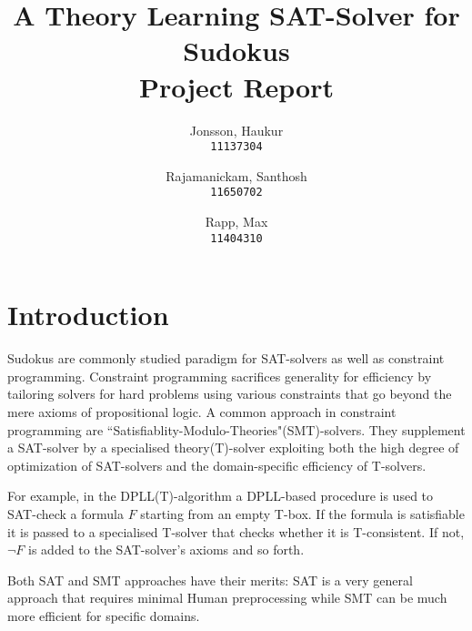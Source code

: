\documentclass{article}
\begin{document}
\author{
  Jonsson, Haukur\\
  \texttt{11137304}
  \and
  Rajamanickam, Santhosh\\
  \texttt{11650702}
  \and
  Rapp, Max\\
  \texttt{11404310}
}
\title{A Theory Learning SAT-Solver for Sudokus\\
	\large Project Report}
\maketitle



\section{Introduction}


Sudokus are commonly studied paradigm for SAT-solvers as well as constraint programming. Constraint programming sacrifices generality for efficiency by tailoring solvers for hard problems using various constraints that go beyond the mere axioms of propositional logic. A common approach in constraint programming are ``Satisfiablity-Modulo-Theories"(SMT)-solvers. They supplement a SAT-solver by a specialised theory(T)-solver exploiting both the high degree of optimization of SAT-solvers and the domain-specific efficiency of T-solvers.

For example, in the DPLL(T)-algorithm a DPLL-based procedure is used to SAT-check a formula $F$ starting from an empty T-box. If the formula is satisfiable it is passed to a specialised T-solver that checks whether it is T-consistent. If not, $\neg F$ is added to the SAT-solver's axioms and so forth.

Both SAT and SMT approaches have their merits: SAT is a very general approach that requires minimal Human preprocessing while SMT can be much more efficient for specific domains.
\end{document}
